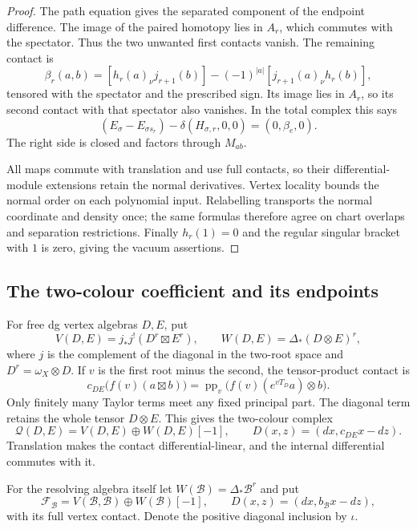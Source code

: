 \begin{proof}
The path equation gives the separated component of the
endpoint difference. The image of the paired homotopy lies
in $A_r$, which commutes with the spectator. Thus the two
unwanted first contacts vanish. The remaining contact is
\begin{equation}\label{eq:vol2-supported-binary-lift}
 \beta_r(a,b)=[h_r(a)_\nu j_{r+1}(b)]
       -(-1)^{|a|}[j_{r+1}(a)_\nu h_r(b)],
\end{equation}
tensored with the spectator and the prescribed sign. Its
image lies in $A_r$, so its second contact with that spectator
also vanishes. In the total complex this says
\[
 (E_\sigma-E_{\sigma s_r})
          -\delta(H_{\sigma,r},0,0)=(0,\beta_e,0).
\]
The right side is closed and factors through $M_{ab}$.

All maps commute with translation and use full contacts, so
their differential-module extensions retain the normal
derivatives. Vertex locality bounds the normal order on each
polynomial input. Relabelling transports the normal coordinate
and density once; the same formulas therefore agree on chart
overlaps and separation restrictions. Finally $h_r(1)=0$ and
the regular singular bracket with $1$ is zero, giving the
vacuum assertions.
\end{proof}

\subsection{The two-colour coefficient and its endpoints}

For free dg vertex algebras $D,E$, put
\[
 V(D,E)=j_*j^!(D^r\boxtimes E^r),\qquad
 W(D,E)=\Delta_*(D\otimes E)^r,
\]
where $j$ is the complement of the diagonal in the two-root
space and $D^r=\omega_X\otimes D$. If $v$ is the first root
minus the second, the tensor-product contact is
\begin{equation}\label{eq:vol2-coloured-contact}
 c_{DE}\bigl(f(v)(a\boxtimes b)\bigr)
 =\operatorname{pp}_v\bigl(f(v)(e^{vT_D}a)\otimes b\bigr).
\end{equation}
Only finitely many Taylor terms meet any fixed principal part.
The diagonal term retains the whole tensor $D\otimes E$.
This gives the two-colour complex
\[
 \mathcal Q(D,E)=V(D,E)\oplus W(D,E)[-1],\qquad
 D(x,z)=(dx,c_{DE}x-dz).
\]
Translation makes the contact differential-linear, and the
internal differential commutes with it.

For the resolving algebra itself let
$W(\mathcal B)=\Delta_*\mathcal B^r$ and put
\[
 \mathcal F_{\mathcal B}
   =V(\mathcal B,\mathcal B)\oplus W(\mathcal B)[-1],
 \qquad D(x,z)=(dx,b_{\mathcal B}x-dz),
\]
with its full vertex contact. Denote the positive diagonal
inclusion by $\iota$.

